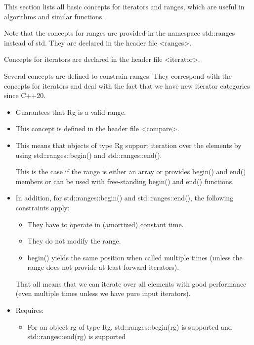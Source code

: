 
This section lists all basic concepts for iterators and ranges, which are useful in algorithms and similar functions.

Note that the concepts for ranges are provided in the namespace std::ranges instead of std. They are declared in the header file <ranges>.

Concepts for iterators are declared in the header file <iterator>.


Several concepts are defined to constrain ranges. They correspond with the concepts for iterators and deal with the fact that we have new iterator categories since C++20.


\begin{itemize}
\item
Guarantees that Rg is a valid range.

\item
This concept is defined in the header file <compare>.

\item
This means that objects of type Rg support iteration over the elements by using std::ranges::begin() and std::ranges::end().

This is the case if the range is either an array or provides begin() and end() members or can be used with free-standing begin() and end() functions.

\item
In addition, for std::ranges::begin() and std::ranges::end(), the following constraints apply:

\begin{itemize}
\item
They have to operate in (amortized) constant time.

\item
They do not modify the range.

\item
begin() yields the same position when called multiple times (unless the range does not provide at least forward iterators).
\end{itemize}

That all means that we can iterate over all elements with good performance (even multiple times unless we have pure input iterators).

\item
Requires:

\begin{itemize}
\item
For an object rg of type Rg, std::ranges::begin(rg) is supported and std::ranges::end(rg) is supported
\end{itemize}
\end{itemize}

